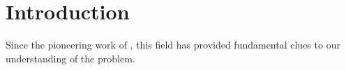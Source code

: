\section{Introduction}
\label{sec:intro}

Since the pioneering work of \citet{1926ApJ....64..321H}, this field has provided fundamental clues to our understanding of the problem.


